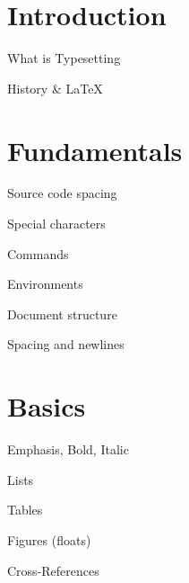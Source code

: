 \documentclass[xetex,mathserif]{beamer}
\begin{document}
\section{Introduction}

\begin{frame}{What is Typesetting}
\end{frame}

\begin{frame}{History \& \textrm{\LaTeX}}
\end{frame}

\section{Fundamentals}
\begin{frame}{Source code spacing}
\end{frame}

\begin{frame}{Special characters}
\end{frame}

\begin{frame}{Commands}
\end{frame}

\begin{frame}{Environments}
\end{frame}

\begin{frame}{Document structure}
\end{frame}

\begin{frame}{Spacing and newlines}
\end{frame}

\section{Basics}
\begin{frame}{Emphasis, Bold, Italic}
\end{frame}

\begin{frame}{Lists}
\end{frame}

\begin{frame}{Tables}
\end{frame}

\begin{frame}{Figures (floats)}
\end{frame}

\begin{frame}{Cross-References}
\end{frame}
\end{document}
